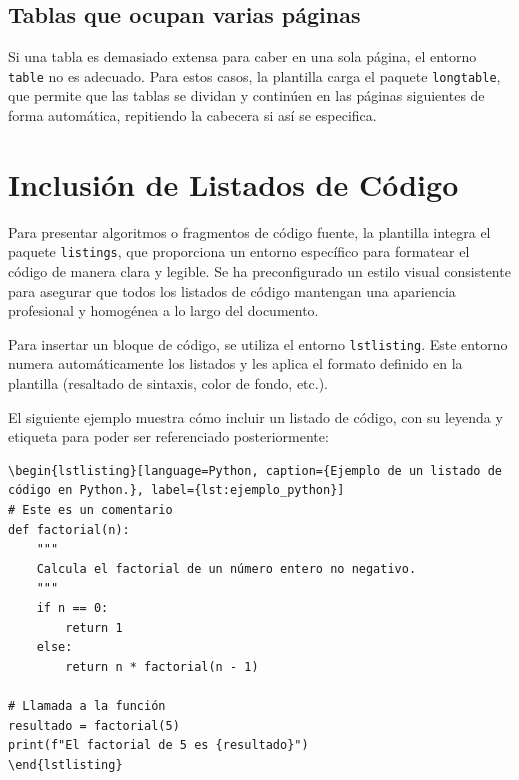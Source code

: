 \documentclass[11pt,a4paper]{book}
\begin{document}
\subsection{Tablas que ocupan varias páginas}
Si una tabla es demasiado extensa para caber en una sola página, el entorno \texttt{table} no es adecuado. Para estos casos, la plantilla carga el paquete \texttt{longtable}, que permite que las tablas se dividan y continúen en las páginas siguientes de forma automática, repitiendo la cabecera si así se especifica.

\section{Inclusión de Listados de Código}
\label{sec:listados_codigo}

Para presentar algoritmos o fragmentos de código fuente, la plantilla integra el paquete \texttt{listings}, que proporciona un entorno específico para formatear el código de manera clara y legible. Se ha preconfigurado un estilo visual consistente para asegurar que todos los listados de código mantengan una apariencia profesional y homogénea a lo largo del documento.

Para insertar un bloque de código, se utiliza el entorno \texttt{lstlisting}. Este entorno numera automáticamente los listados y les aplica el formato definido en la plantilla (resaltado de sintaxis, color de fondo, etc.).

El siguiente ejemplo muestra cómo incluir un listado de código, con su leyenda y etiqueta para poder ser referenciado posteriormente:

\begin{verbatim}
\begin{lstlisting}[language=Python, caption={Ejemplo de un listado de código en Python.}, label={lst:ejemplo_python}]
# Este es un comentario
def factorial(n):
    """
    Calcula el factorial de un número entero no negativo.
    """
    if n == 0:
        return 1
    else:
        return n * factorial(n - 1)

# Llamada a la función
resultado = factorial(5)
print(f"El factorial de 5 es {resultado}")
\end{lstlisting}
\end{verbatim}
\end{document}
